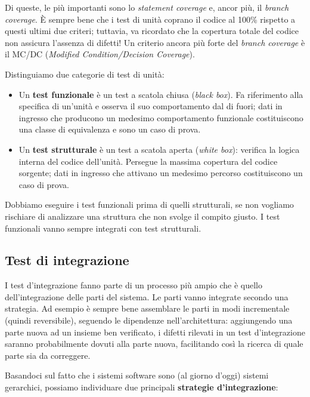 \documentclass[a4paper]{article}
\begin{document}
		
Di queste, le più importanti sono lo \emph{statement coverage} e, ancor più, il \emph{branch coverage}. È sempre bene che i test di unità coprano il codice al 100\% rispetto a questi ultimi due criteri; tuttavia, va ricordato che la copertura totale del codice non assicura l'assenza di difetti! Un criterio ancora più forte del \emph{branch coverage} è il MC/DC (\emph{Modified Condition/Decision Coverage}).
		
Distinguiamo due categorie di test di unità:
		
	\begin{itemize}
		
			
	\item Un \textbf{test funzionale} è un test a scatola chiusa (\emph{black box}). Fa riferimento alla specifica di un'unità e osserva il suo comportamento dal di fuori; dati in ingresso che producono un medesimo comportamento funzionale costituiscono una classe di equivalenza e sono un caso di prova.
			
	\item Un \textbf{test strutturale} è un test a scatola aperta (\emph{white box}): verifica la logica interna del codice dell'unità. Persegue la massima copertura del codice sorgente; dati in ingresso che attivano un medesimo percorso costituiscono un caso di prova.
		
	\end{itemize}

		
Dobbiamo eseguire i test funzionali prima di quelli strutturali, se non vogliamo rischiare di analizzare una struttura che non svolge il compito giusto. I test funzionali vanno sempre integrati con test strutturali.

		
	\subsection{Test di integrazione}

		
I test d'integrazione fanno parte di un processo più ampio che è quello dell'integrazione delle parti del sistema. Le parti vanno integrate secondo una strategia. Ad esempio è sempre bene assemblare le parti in modi incrementale (quindi reversibile), seguendo le dipendenze nell'architettura: aggiungendo una parte nuova ad un insieme ben verificato, i difetti rilevati in un test d'integrazione saranno probabilmente dovuti alla parte nuova, facilitando così la ricerca di quale parte sia da correggere.
		
Basandoci sul fatto che i sistemi software sono (al giorno d'oggi) sistemi gerarchici, possiamo individuare due principali \textbf{strategie d'integrazione}:
		
\end{document}
